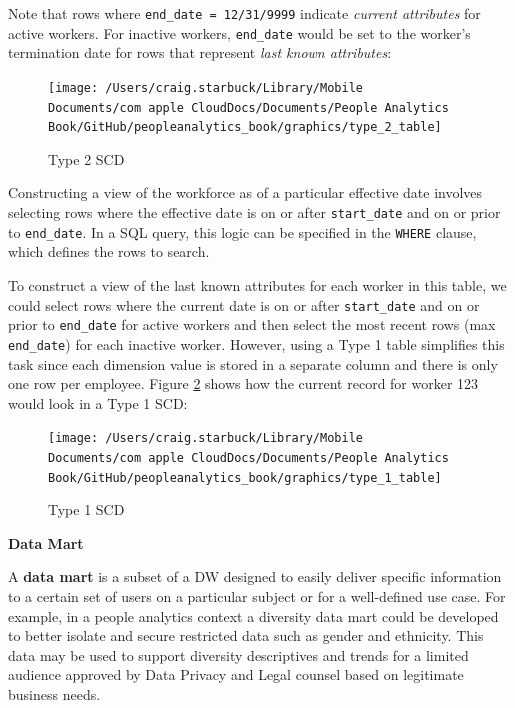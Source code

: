 \documentclass[
]{book}
\begin{document}
Note that rows where \texttt{end\_date\ =\ \textquotesingle{}12/31/9999\textquotesingle{}} indicate \emph{current attributes} for active workers. For inactive workers, \texttt{end\_date} would be set to the worker's termination date for rows that represent \emph{last known attributes}:

\begin{figure}

{\centering \texttt{[image: /Users/craig.starbuck/Library/Mobile Documents/com~apple~CloudDocs/Documents/People Analytics Book/GitHub/peopleanalytics\_book/graphics/type\_2\_table]} 

}

\caption{Type 2 SCD}\label{fig:type-2-tbl}
\end{figure}

Constructing a view of the workforce as of a particular effective date involves selecting rows where the effective date is on or after \texttt{start\_date} and on or prior to \texttt{end\_date}. In a SQL query, this logic can be specified in the \texttt{WHERE} clause, which defines the rows to search.

To construct a view of the last known attributes for each worker in this table, we could select rows where the current date is on or after \texttt{start\_date} and on or prior to \texttt{end\_date} for active workers and then select the most recent rows (max \texttt{end\_date}) for each inactive worker. However, using a Type 1 table simplifies this task since each dimension value is stored in a separate column and there is only one row per employee. Figure \ref{fig:type-1-tbl} shows how the current record for worker 123 would look in a Type 1 SCD:

\begin{figure}

{\centering \texttt{[image: /Users/craig.starbuck/Library/Mobile Documents/com~apple~CloudDocs/Documents/People Analytics Book/GitHub/peopleanalytics\_book/graphics/type\_1\_table]} 

}

\caption{Type 1 SCD}\label{fig:type-1-tbl}
\end{figure}

\textbf{Data Mart}

A \textbf{data mart} is a subset of a DW designed to easily deliver specific information to a certain set of users on a particular subject or for a well-defined use case. For example, in a people analytics context a diversity data mart could be developed to better isolate and secure restricted data such as gender and ethnicity. This data may be used to support diversity descriptives and trends for a limited audience approved by Data Privacy and Legal counsel based on legitimate business needs.
\end{document}

